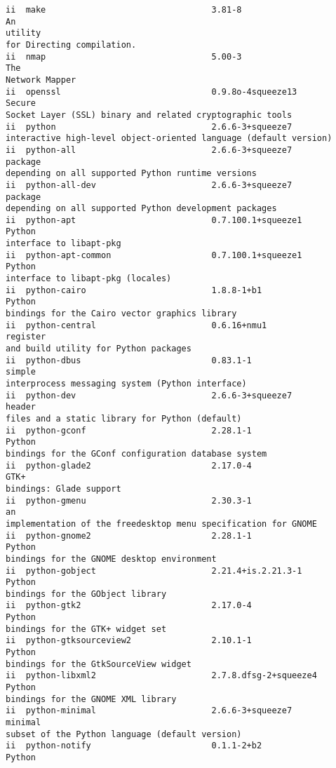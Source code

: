 \documentclass[a4paper,12pt]{report}
\newenvironment{myscriptlisting}
{\begin{list}{}{\setlength{\leftmargin}{1em}}\item\scriptsize\bfseries}
{\end{list}}
\begin{document}
\begin{myscriptlisting}
\begin{verbatim}
ii  make                                 3.81-8                         An
utility
for Directing compilation.
ii  nmap                                 5.00-3                         The
Network Mapper
ii  openssl                              0.9.8o-4squeeze13              Secure
Socket Layer (SSL) binary and related cryptographic tools
ii  python                               2.6.6-3+squeeze7              
interactive high-level object-oriented language (default version)
ii  python-all                           2.6.6-3+squeeze7               package
depending on all supported Python runtime versions
ii  python-all-dev                       2.6.6-3+squeeze7               package
depending on all supported Python development packages
ii  python-apt                           0.7.100.1+squeeze1             Python
interface to libapt-pkg
ii  python-apt-common                    0.7.100.1+squeeze1             Python
interface to libapt-pkg (locales)
ii  python-cairo                         1.8.8-1+b1                     Python
bindings for the Cairo vector graphics library
ii  python-central                       0.6.16+nmu1                    register
and build utility for Python packages
ii  python-dbus                          0.83.1-1                       simple
interprocess messaging system (Python interface)
ii  python-dev                           2.6.6-3+squeeze7               header
files and a static library for Python (default)
ii  python-gconf                         2.28.1-1                       Python
bindings for the GConf configuration database system
ii  python-glade2                        2.17.0-4                       GTK+
bindings: Glade support
ii  python-gmenu                         2.30.3-1                       an
implementation of the freedesktop menu specification for GNOME
ii  python-gnome2                        2.28.1-1                       Python
bindings for the GNOME desktop environment
ii  python-gobject                       2.21.4+is.2.21.3-1             Python
bindings for the GObject library
ii  python-gtk2                          2.17.0-4                       Python
bindings for the GTK+ widget set
ii  python-gtksourceview2                2.10.1-1                       Python
bindings for the GtkSourceView widget
ii  python-libxml2                       2.7.8.dfsg-2+squeeze4          Python
bindings for the GNOME XML library
ii  python-minimal                       2.6.6-3+squeeze7               minimal
subset of the Python language (default version)
ii  python-notify                        0.1.1-2+b2                     Python

\end{verbatim}
\end{myscriptlisting}
\end{document}
